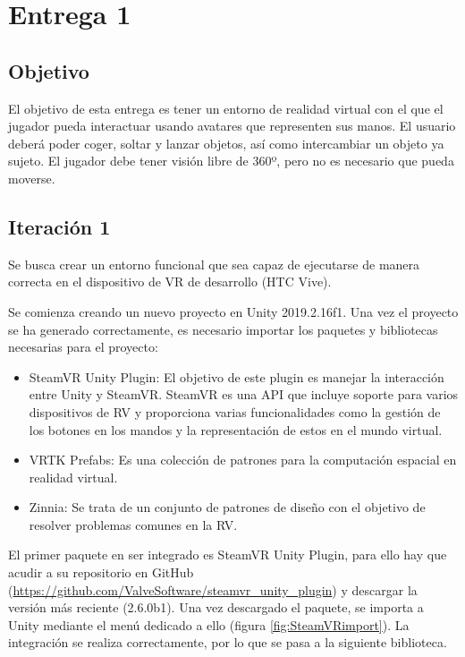 \section{Entrega 1}

\subsection{Objetivo}

El objetivo de esta entrega es tener un entorno de realidad virtual con el que el jugador pueda interactuar usando avatares que representen sus manos. El usuario deberá poder coger, soltar y lanzar objetos, así como intercambiar un objeto ya sujeto. El jugador debe tener visión libre de 360º, pero no es necesario que pueda moverse.


\subsection{Iteración 1}

Se busca crear un entorno funcional que sea capaz de ejecutarse de manera correcta en el dispositivo de VR de desarrollo (HTC Vive).

Se comienza creando un nuevo proyecto en Unity 2019.2.16f1. Una vez el proyecto se ha generado correctamente, es necesario importar los paquetes y bibliotecas necesarias para el proyecto:


\begin{itemize}
	\item{SteamVR Unity Plugin: El objetivo de este plugin es manejar la interacción entre Unity y SteamVR. SteamVR es una API que incluye soporte para varios dispositivos de RV y proporciona varias funcionalidades como la gestión de los botones en los mandos y la representación de estos en el mundo virtual.}

	\item{VRTK Prefabs: Es una colección de patrones para la computación espacial en realidad virtual.}
	
	\item{Zinnia: Se trata de un conjunto de patrones de diseño con el objetivo de resolver problemas comunes en la RV.}

\end{itemize}

El primer paquete en ser integrado es SteamVR Unity Plugin, para ello hay que acudir a su repositorio en GitHub (\url{https://github.com/ValveSoftware/steamvr\_unity\_plugin}) y descargar la versión más reciente (2.6.0b1). Una vez descargado el paquete, se importa a Unity mediante el menú dedicado a ello (figura \ref{fig:SteamVRimport}). La integración se realiza correctamente, por lo que se pasa a la siguiente biblioteca.

